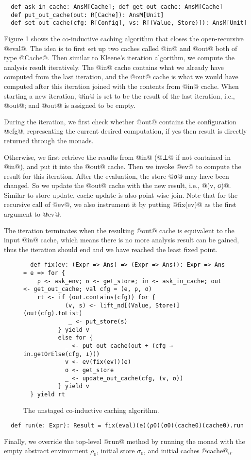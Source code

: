 \begin{lstlisting}
  def ask_in_cache: AnsM[Cache]; def get_out_cache: AnsM[Cache]
  def put_out_cache(out: R[Cache]): AnsM[Unit]
  def set_out_cache(cfg: R[Config], vs: R[(Value, Store)]): AnsM[Unit]
\end{lstlisting}

Figure \ref{fig:coind_cache} shows the co-inductive caching algorithm that
closes the open-recursive @eval@.
The idea is to first set up two caches called @in@ and @out@ both of type
@Cache@. Then similar to Kleene's iteration algorithm, we compute the analysis
result iteratively. The @in@ cache contains what we already have computed from
the last iteration, and the @out@ cache is what we would have computed after this
iteration joined with the contents from @in@ cache.
When starting a new iteration, @in@ is set to be the result of the last
iteration, i.e., @out@; and @out@ is assigned to be empty.

During the iteration, we first check whether @out@ contains the configuration
@cfg@, representing the current desired computation, if
yes then result is directly returned through the monads.

Otherwise, we first retrieve the results from @in@ (@⊥@ if not contained in
@in@), and put it into the @out@ cache.
Then we invoke @ev@ to compute the result for this iteration.
After the evaluation, the store @σ@ may have been changed. So we update the
@out@ cache with the new result, i.e., @(v, σ)@. Similar to store update, cache
update is also point-wise join.
Note that for the recursive call of @ev@, we also instrument it by putting
@fix(ev)@ as the first argument to @ev@.

The iteration terminates when the resulting @out@ cache is equivalent to the
input @in@ cache, which means there is no more analysis result can be gained,
thus the iteration should end and we have reached the least fixed point.

\begin{figure}[t!]
  \centering
\begin{lstlisting}
  def fix(ev: (Expr => Ans) => (Expr => Ans)): Expr => Ans = e => for {
    ρ <- ask_env; σ <- get_store; in <- ask_in_cache; out <- get_out_cache; val cfg = (e, ρ, σ)
    rt <- if (out.contains(cfg)) for {
            (v, s) <- lift_nd[(Value, Store)](out(cfg).toList)
             _ <- put_store(s)
          } yield v
          else for {
            _ <- put_out_cache(out + (cfg → in.getOrElse(cfg, ⊥)))
            v <- ev(fix(ev))(e)
            σ <- get_store
            _ <- update_out_cache(cfg, (v, σ))
          } yield v
  } yield rt
\end{lstlisting}
\vspace{-1em}
\caption{The unstaged co-inductive caching algorithm.}
\label{fig:coind_cache}
\end{figure}

\begin{lstlisting}
  def run(e: Expr): Result = fix(eval)(e)(ρ0)(σ0)(cache0)(cache0).run
\end{lstlisting}

Finally, we override the top-level @run@ method by running the monad with
the empty abstract environment $\rho_0$, initial store $\sigma_0$, and initial
caches @cache@$_0$.
